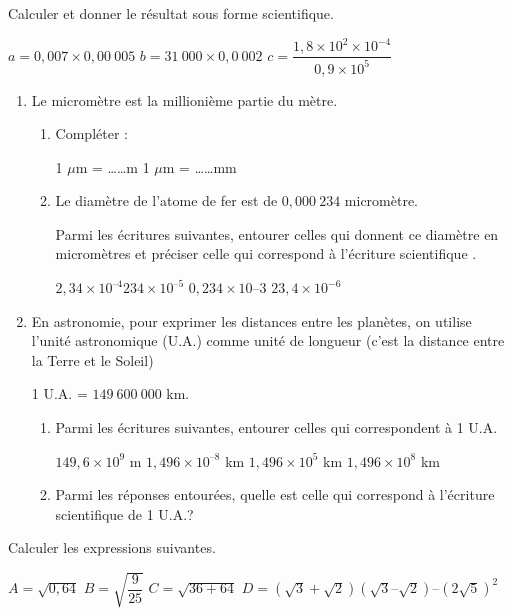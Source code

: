 \documentclass[french,12pt]{report}
\begin{document}
\begin{Exercice}
Calculer et donner le résultat sous forme scientifique.\par 
$a = 0,007 \times 0,00~005$ \hfill $b = 31~000 \times 0,0~002 $ \hfill $c = \dfrac{1,8 \times 10^2 \times 10^{- 4}}{0,9\times 10^5} $
\end{Exercice}


\begin{Exercice}
\begin{enumerate}[label=\arabic*.]

\item Le micromètre est la millionième partie du mètre. 
\begin{enumerate}[label=\alph*)]
	\item Compléter : \par 
	1 $\mu$m = \ldots \ldots m \hspace{4cm} 1 $\mu$m = \ldots \ldots mm
	
	\item Le diamètre de l'atome de fer est de $0,000~234$ micromètre. \par 
	Parmi les écritures suivantes, entourer celles qui donnent ce diamètre en micromètres et préciser celle qui correspond à l'écriture scientifique .\par 

$2,34 \times 10^{– 4}$\hfill 	$234 \times 10^{–5}$ \hfill	$0,234\times 10{– 3}$ \hfill $	23,4 \times 10^{- 6}$ \par 

		
	\end{enumerate}
 \item En astronomie, pour exprimer les distances entre les planètes, on utilise l’unité astronomique (U.A.) comme unité de longueur (c’est la distance entre la Terre et le Soleil) \par 
1 U.A. = $149~600~000$ km.
\begin{enumerate}[label=\alph*)]
	\item Parmi les écritures suivantes, entourer celles qui correspondent à 1 U.A. \par 

$149,6 \times 10^9$  m \hfill	$1,496 \times 10^{– 8}$  km \hfill 	$1,496 \times 10^5$  km \hfill	$1,496 \times 10^8 $ km
	
	\item  Parmi les réponses entourées, quelle est celle qui correspond à l'écriture scientifique de 1 U.A.?
	
		
	\end{enumerate}

\end{enumerate}


\end{Exercice}
\begin{Exercice}
Calculer les expressions suivantes. \par 

$A = \sqrt{0,64}$ \hfill $B = \sqrt{\dfrac{9}{25}}$ \hfill $C = \sqrt{36+64}$	\hfill $D = (\sqrt{3} + \sqrt{2})(\sqrt{3} – \sqrt{2}) – (2\sqrt{5})^2$ \par 


\end{Exercice}
\end{document}
